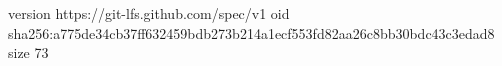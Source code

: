 version https://git-lfs.github.com/spec/v1
oid sha256:a775de34cb37ff632459bdb273b214a1ecf553fd82aa26c8bb30bdc43c3edad8
size 73
